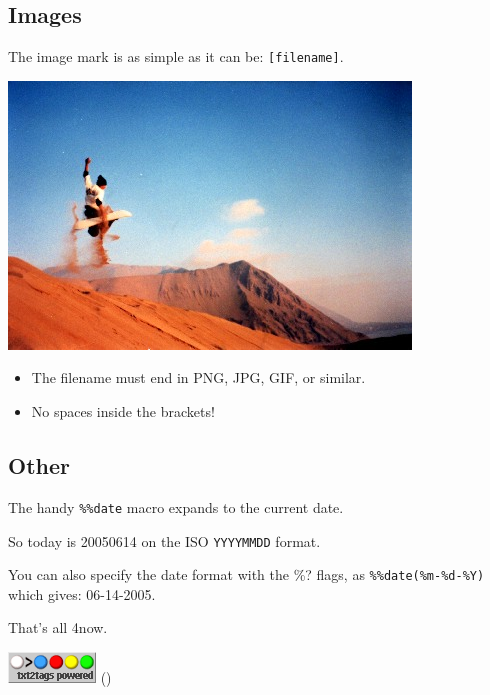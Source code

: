 \documentclass[11pt,a4paper]{article}
\begin{document}
\subsection*{Images}
The image mark is as simple as it can be: \texttt{[filename]}.

                      \includegraphics{img/photo.jpg}  

\begin{itemize}
\item The filename must end in PNG, JPG, GIF, or similar.
\item No spaces inside the brackets!
\end{itemize}

\subsection*{Other}
The handy \texttt{\%\%date} macro expands to the current date.

So today is 20050614 on the ISO \texttt{YYYYMMDD} format.

You can also specify the date format with the \%? flags,
as \texttt{\%\%date(\%m-\%d-\%Y)} which gives: 06-14-2005.

That's all 4now.


\hrulefill{}

\includegraphics{img/t2tpowered.png} ()


\end{document}
